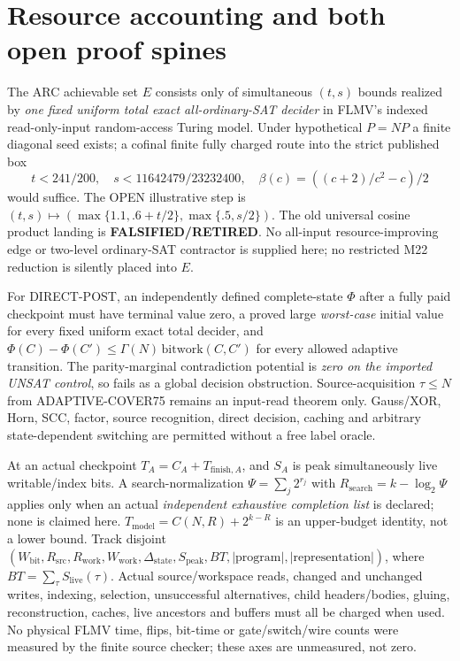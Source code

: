 \documentclass[11pt]{article}
\begin{document}
\section{Resource accounting and both open proof spines}
The ARC achievable set $E$ consists only of simultaneous $(t,s)$ bounds realized by \emph{one fixed uniform total exact all-ordinary-SAT decider} in FLMV's indexed read-only-input random-access Turing model. Under hypothetical $P=NP$ a finite diagonal seed exists; a cofinal finite fully charged route into the strict published box
\[
t<241/200,\quad s<11642479/23232400,\quad
\beta(c)=((c+2)/c^2-c)/2
\]
would suffice. The OPEN illustrative step is $(t,s)\mapsto(\max\{1.1,.6+t/2\},\max\{.5,s/2\})$. The old universal cosine product landing is \textbf{FALSIFIED/RETIRED}. No all-input resource-improving edge or two-level ordinary-SAT contractor is supplied here; no restricted M22 reduction is silently placed into $E$.
\par\noindent For DIRECT-POST, an independently defined complete-state $\Phi$ after a fully paid checkpoint must have terminal value zero, a proved large \emph{worst-case} initial value for every fixed uniform exact total decider, and $\Phi(C)-\Phi(C')\le\Gamma(N)\,\mathrm{bitwork}(C,C')$ for every allowed adaptive transition. The parity-marginal contradiction potential is \emph{zero on the imported UNSAT control}, so fails as a global decision obstruction. Source-acquisition $\tau\le N$ from ADAPTIVE-COVER75 remains an input-read theorem only. Gauss/XOR, Horn, SCC, factor, source recognition, direct decision, caching and arbitrary state-dependent switching are permitted without a free label oracle.
\par\noindent At an actual checkpoint $T_A=C_A+T_{\mathrm{finish},A}$, and $S_A$ is peak simultaneously live writable/index bits. A search-normalization $\Psi=\sum_j2^{r_j}$ with $R_{\mathrm{search}}=k-\log_2\Psi$ applies only when an actual \emph{independent exhaustive completion list} is declared; none is claimed here. $T_{\mathrm{model}}=C(N,R)+2^{k-R}$ is an upper-budget identity, not a lower bound. Track disjoint $(W_{\mathrm{bit}},R_{\mathrm{src}},R_{\mathrm{work}},W_{\mathrm{work}},\Delta_{\mathrm{state}},S_{\mathrm{peak}},BT,|\mathrm{program}|,|\mathrm{representation}|)$, where $BT=\sum_{\tau}S_{\mathrm{live}}(\tau)$. Actual source/workspace reads, changed and unchanged writes, indexing, selection, unsuccessful alternatives, child headers/bodies, gluing, reconstruction, caches, live ancestors and buffers must all be charged when used. No physical FLMV time, flips, bit-time or gate/switch/wire counts were measured by the finite source checker; these axes are unmeasured, not zero.
\end{document}
